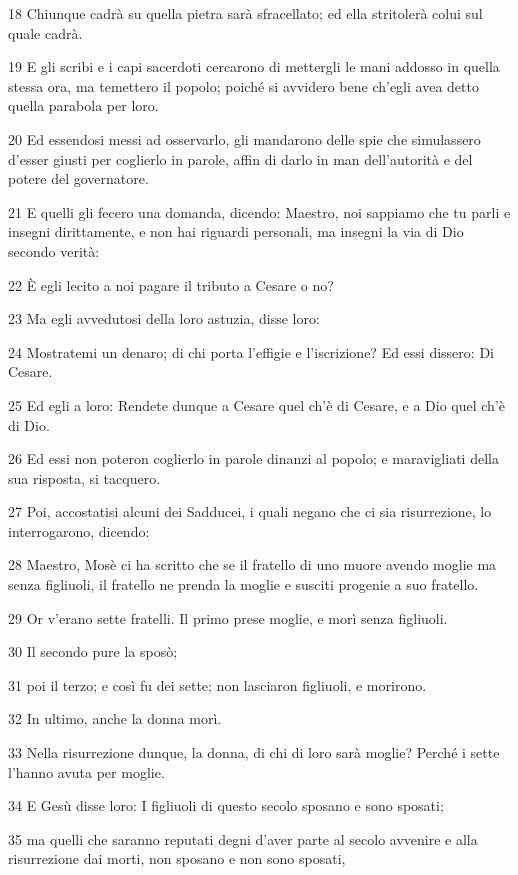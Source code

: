 \par 18 Chiunque cadrà su quella pietra sarà sfracellato; ed ella stritolerà colui sul quale cadrà.
\par 19 E gli scribi e i capi sacerdoti cercarono di mettergli le mani addosso in quella stessa ora, ma temettero il popolo; poiché si avvidero bene ch'egli avea detto quella parabola per loro.
\par 20 Ed essendosi messi ad osservarlo, gli mandarono delle spie che simulassero d'esser giusti per coglierlo in parole, affin di darlo in man dell'autorità e del potere del governatore.
\par 21 E quelli gli fecero una domanda, dicendo: Maestro, noi sappiamo che tu parli e insegni dirittamente, e non hai riguardi personali, ma insegni la via di Dio secondo verità:
\par 22 È egli lecito a noi pagare il tributo a Cesare o no?
\par 23 Ma egli avvedutosi della loro astuzia, disse loro:
\par 24 Mostratemi un denaro; di chi porta l'effigie e l'iscrizione? Ed essi dissero: Di Cesare.
\par 25 Ed egli a loro: Rendete dunque a Cesare quel ch'è di Cesare, e a Dio quel ch'è di Dio.
\par 26 Ed essi non poteron coglierlo in parole dinanzi al popolo; e maravigliati della sua risposta, si tacquero.
\par 27 Poi, accostatisi alcuni dei Sadducei, i quali negano che ci sia risurrezione, lo interrogarono, dicendo:
\par 28 Maestro, Mosè ci ha scritto che se il fratello di uno muore avendo moglie ma senza figliuoli, il fratello ne prenda la moglie e susciti progenie a suo fratello.
\par 29 Or v'erano sette fratelli. Il primo prese moglie, e morì senza figliuoli.
\par 30 Il secondo pure la sposò;
\par 31 poi il terzo; e così fu dei sette; non lasciaron figliuoli, e morirono.
\par 32 In ultimo, anche la donna morì.
\par 33 Nella risurrezione dunque, la donna, di chi di loro sarà moglie? Perché i sette l'hanno avuta per moglie.
\par 34 E Gesù disse loro: I figliuoli di questo secolo sposano e sono sposati;
\par 35 ma quelli che saranno reputati degni d'aver parte al secolo avvenire e alla risurrezione dai morti, non sposano e non sono sposati,
